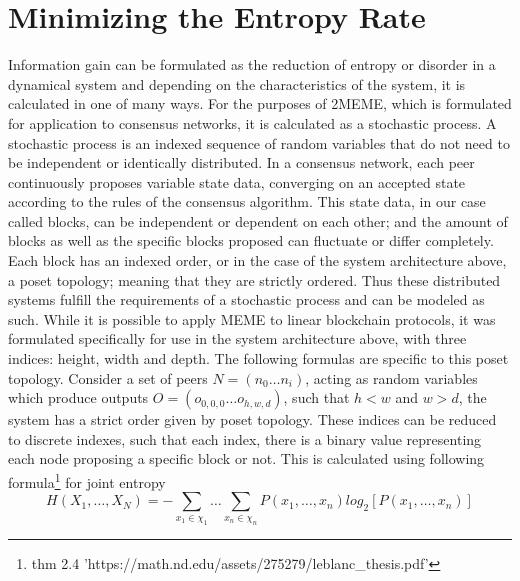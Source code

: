 \documentclass{article}
\begin{document}
\section{Minimizing the Entropy Rate}
Information gain can be formulated as the reduction of entropy or disorder in a dynamical system and depending on the characteristics of the system, it is calculated in one of many ways. For the purposes of 2MEME, which is formulated for application to consensus networks, it is calculated as a stochastic process.
	A stochastic process is an indexed sequence of random variables that do not need to be independent or identically distributed. In a consensus network, each peer continuously proposes variable state data, converging on an accepted state according to the rules of the consensus algorithm. This state data, in our case called blocks, can be independent or dependent on each other; and the amount of blocks as well as the specific blocks proposed can fluctuate or differ completely. Each block has an indexed order, or in the case of the system architecture above, a poset topology; meaning that they are strictly ordered. Thus these distributed systems fulfill the requirements of a stochastic process and can be modeled as such. While it is possible to apply MEME to linear blockchain protocols, it was formulated specifically for use in the system architecture above, with three indices: height, width and depth. The following formulas are specific to this poset topology.
	Consider a set of peers $N = (n_0 …n_i)$, acting as random variables which produce outputs $O = (o_{0,0,0} … o_{h,w,d})$, such that $h<w$ and $w>d$, the system has a strict order given by poset topology. These indices can be reduced to discrete indexes, such that each index, there is a binary value representing each node proposing a specific block or not. This is calculated using following formula\footnote{thm 2.4 'https://math.nd.edu/assets/275279/leblanc_thesis.pdf'} for joint entropy	
\begin{equation}
H(X_1, \dots, X_N) = -\sum_{x_1 \in \chi_1} \dots \sum_{x_n \in \chi_n} P(x_1,  \dots, x_n) log_2 [P(x_1, \dots, x_n)]
\end{equation}
	
\end{document}
